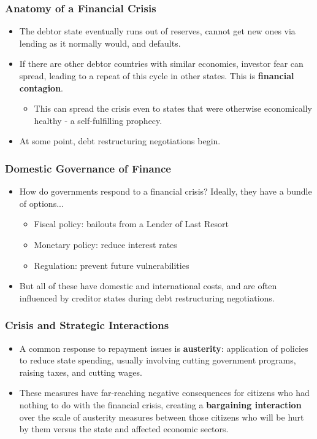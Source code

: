 \documentclass{beamer}
\begin{document}
\begin{frame} 
	\frametitle{\LARGE{Anatomy of a Financial Crisis}}
	\begin{itemize}
		\item The debtor state eventually runs out of reserves, cannot get new ones via lending as it normally would, and defaults. \pause
		\item If there are other debtor countries with similar economies, investor fear can spread, leading to a repeat of this cycle in other states. This is \textbf{financial contagion}. \pause
		\begin{itemize}
			\item This can spread the crisis even to states that were otherwise economically healthy - a self-fulfilling prophecy. \pause
		\end{itemize}
		\item At some point, debt restructuring negotiations begin.		
	\end{itemize}
\end{frame}

\begin{frame} 
	\frametitle{\LARGE{Domestic Governance of Finance}}
	\begin{itemize}
		\item How do governments respond to a financial crisis? Ideally, they  have a bundle of options... \pause
		\begin{itemize}
			\item Fiscal policy: bailouts from a Lender of Last Resort \pause 
			\item Monetary policy: reduce interest rates \pause 
			\item Regulation: prevent future vulnerabilities \pause
		\end{itemize}		
		\item But all of these have domestic and international costs, and are often influenced by creditor states during debt restructuring negotiations. 		
	\end{itemize}
\end{frame}

\begin{frame} 
	\frametitle{\LARGE{Crisis and Strategic Interactions}}
	\begin{itemize}
		\item A common response to repayment issues is \textbf{austerity}: application of policies to reduce state spending, usually involving cutting government programs, raising taxes, and cutting wages. \pause
		\item These measures have far-reaching negative consequences for citizens who had nothing to do with the financial crisis, creating a \textbf{bargaining interaction} over the scale of austerity measures between those citizens who will be hurt by them versus the state and affected economic sectors.
	\end{itemize}
\end{frame}
\end{document}
